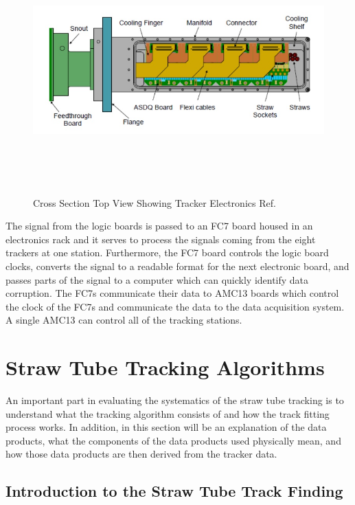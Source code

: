 \documentclass[./Thesis]{subfiles}
\begin{document}
\begin{figure}
	\centerline{\includegraphics[height=95mm]{TopViewTracker.jpeg}}
	\caption[Top View of Tracker Electronics]{ Cross Section Top View Showing Tracker Electronics  Ref. \cite{jGrange}
	}
	\label{fig:TopViewTracker}
\end{figure} 

	
	The  signal  from  the  logic  boards  is  passed  to  an  FC7  board  housed  in  an  electronics rack and it serves to process the signals coming from the eight trackers at one station. Furthermore, the FC7 board controls the logic board clocks, converts the signal to a readable format for the next electronic board, and passes parts of the signal to a computer which can quickly identify data corruption. The FC7s communicate their data to AMC13 boards which control the clock of the FC7s and communicate the data to the data acquisition system.  A single AMC13 can control all of the tracking stations.
	
\section{Straw Tube Tracking Algorithms}

 	An important part in evaluating the systematics of the straw tube tracking is to understand what the tracking algorithm consists of and how the track fitting process works. In addition, in this section will be an explanation of the data products, what the components of the data products used physically mean, and how those data products are then derived from the tracker data. 
		 
\subsection{Introduction to the Straw Tube Track Finding}
\end{document}
